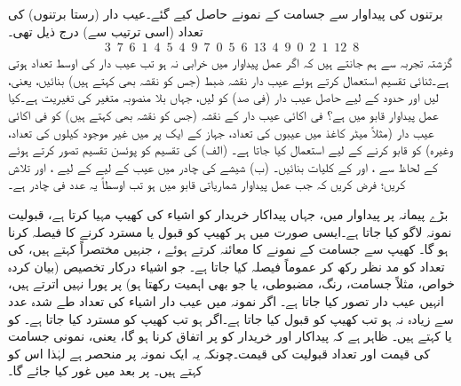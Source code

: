 برتنوں کی پیداوار سے جسامت  کے نمونے حاصل کیے گئے۔عیب دار (رستا برتنوں) کی تعداد (اسی ترتیب سے) درج ذیل تھی۔
\begin{align*}
3\,\,\,7\,\,\,6\,\,\,1\,\,\,4\,\,\,5\,\,\,4\,\,\,9\,\,\,7\,\,\,0\,\,\,5\,\,\,6\,\,\,13\,\,\,4\,\,\,9\,\,\,0\,\,\,2\,\,\,1\,\,\,12\,\,\,8
\end{align*} 
گزشتہ تجربہ سے ہم جانتے ہیں کہ اگر عمل پیداوار میں خرابی نہ ہو تب  عیب دار کی اوسط تعداد  ہوتی ہے۔ثنائی تقسیم استعمال کرتے ہوئے عیب دار نقشہ ضبط (جس کو  نقشہ بھی کہتے ہیں) بنائیں، یعنی،  لیں اور   حدود کے لیے حاصل عیب دار (فی صد)  کو  لیں، جہاں بلا منصوبہ متغیر  کی تغیریت  ہے۔کیا عمل پیداوار قابو میں ہے؟
\quad {} \quad
فی اکائی عیب دار کے نقشہ (جس کو  نقشہ بھی کہتے ہیں) کو فی اکائی عیب دار  (مثلاً  میٹر کاغذ میں عیبوں کی تعداد، جہاز کے ایک پر میں غیر موجود کیلوں کی تعداد، وغیرہ) کو قابو کرنے کے لیے استعمال کیا جاتا ہے۔ (الف)    کی تقسیم کو  پوئسن تقسیم تصور کرتے ہوئے   کے لحاظ سے ،   اور  کے کلیات بنائیں۔ (ب) شیشے کی چادر میں عیب کے لیے  کے لیے ،  اور  تلاش کریں؛ فرض کریں کہ جب عمل پیداوار شماریاتی قابو میں ہو تب اوسطاً یہ عدد  فی چادر ہے۔ 

بڑے پیمانہ پر پیداوار میں، جہاں پیداکار خریدار کو  اشیاء کی کھیپ مہیا کرتا ہے، قبولیت نمونہ لاگو کیا جاتا ہے۔ایسی صورت میں ہر کھیپ کو قبول یا مسترد کرنے کا فیصلہ کرنا ہو گا۔  کھیپ سے  جسامت کے نمونے کا معائنہ کرتے ہوئے  ، جنہیں مختصراً  کہتے ہیں،  کی تعداد کو مد نظر رکھ کر عموماً  فیصلہ کیا جاتا ہے۔ جو اشیاء درکار تخصیص  (بیان کردہ خواص، مثلاً جسامت، رنگ، مضبوطی، یا جو بھی اہمیت رکھتا ہو) پر پورا نہیں اترتے ہیں، انہیں عیب دار تصور کیا جاتا ہے۔ اگر نمونہ میں عیب دار اشیاء  کی تعداد  طے شدہ عدد  سے زیادہ نہ ہو تب کھیپ کو قبول کیا جاتا ہے۔اگر  ہو تب کھیپ کو مسترد کیا جاتا ہے۔ کو  یا  کہتے ہیں۔ ظاہر ہے کہ پیداکار اور خریدار کو   پر اتفاق کرنا ہو گا، یعنی، نمونی جسامت  کی قیمت  اور تعداد قبولیت  کی قیمت۔چونکہ یہ ایک نمونہ پر منحصر ہے لہٰذا اس  کو  کہتے ہیں۔  پر بعد میں غور کیا جائے گا۔

